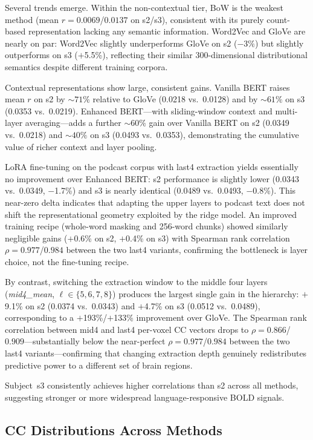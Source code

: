 Several trends emerge.  Within the non-contextual tier, BoW is the weakest
method (mean $r = 0.0069$/$0.0137$ on s2/s3), consistent with its purely
count-based representation lacking any semantic information.  Word2Vec and GloVe
are nearly on par: Word2Vec slightly underperforms GloVe on s2 ($-3\%$) but
slightly outperforms on s3 ($+$5.5\%), reflecting their similar 300-dimensional
distributional semantics despite different training corpora.

Contextual representations show large, consistent gains.  Vanilla BERT raises
mean $r$ on s2 by ${\sim}71\%$ relative to GloVe (0.0218 vs.\ 0.0128) and by
${\sim}61\%$ on s3 (0.0353 vs.\ 0.0219).  Enhanced BERT---with sliding-window
context and multi-layer averaging---adds a further ${\sim}60\%$ gain over Vanilla
BERT on s2 (0.0349 vs.\ 0.0218) and ${\sim}40\%$ on s3 (0.0493 vs.\ 0.0353),
demonstrating the cumulative value of richer context and layer pooling.

LoRA fine-tuning on the podcast corpus with last4 extraction yields essentially
no improvement over Enhanced BERT: s2 performance is slightly lower
(0.0343 vs.\ 0.0349, $-$1.7\%) and s3 is nearly identical
(0.0489 vs.\ 0.0493, $-$0.8\%).  This near-zero delta indicates that adapting
the upper layers to podcast text does not shift the representational geometry
exploited by the ridge model.  An improved training recipe (whole-word masking
and 256-word chunks) showed similarly negligible gains ($+$0.6\% on s2,
$+$0.4\% on s3) with Spearman rank correlation $\rho = 0.977$/$0.984$ between
the two last4 variants, confirming the bottleneck is layer choice, not the
fine-tuning recipe.

By contrast, switching the extraction window to the middle four layers
(\textit{mid4\_mean}, $\ell \in \{5,6,7,8\}$) produces the largest single gain
in the hierarchy: $+$9.1\% on s2 (0.0374 vs.\ 0.0343) and $+$4.7\% on s3
(0.0512 vs.\ 0.0489), corresponding to a $+$193\%/$+$133\% improvement over
GloVe.  The Spearman rank correlation between mid4 and last4 per-voxel CC
vectors drops to $\rho = 0.866$/$0.909$---substantially below the near-perfect
$\rho = 0.977$/$0.984$ between the two last4 variants---confirming that changing
extraction depth genuinely redistributes predictive power to a different set of
brain regions.

Subject~s3 consistently achieves higher correlations than s2 across all methods,
suggesting stronger or more widespread language-responsive BOLD signals.


\subsection{CC Distributions Across Methods}


